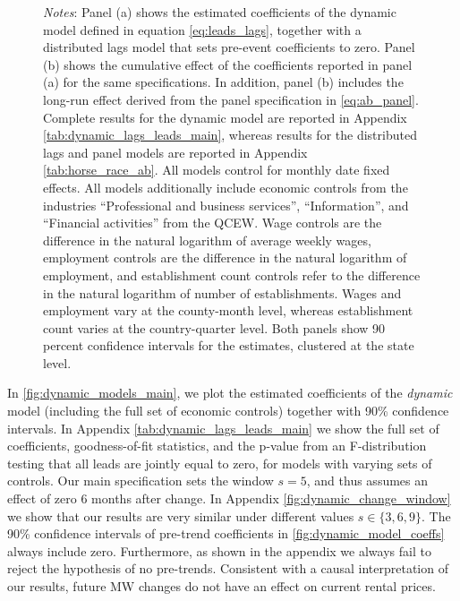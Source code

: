 \begin{figure}[htb!]
\begin{minipage}{0.95\textwidth}
		\vspace{2mm} 
		\textit{Notes}: Panel (a) shows the estimated coefficients of the dynamic model defined 
		in equation \autoref{eq:leads_lags}, together with a distributed lags model that sets 
		pre-event coefficients to zero. Panel (b) shows the cumulative effect of the coefficients 
		reported in panel (a) for the same specifications. In addition, panel (b) includes the 
		long-run effect derived from the panel specification in \autoref{eq:ab_panel}. Complete 
		results for the dynamic model are reported in Appendix 
		\autoref{tab:dynamic_lags_leads_main}, whereas results for the distributed lags and panel 
		models are reported in Appendix \autoref{tab:horse_race_ab}. All models control for 
		monthly date fixed effects. All models additionally  include economic controls from the 
		industries ``Professional and business services'', ``Information'', and ``Financial 
		activities'' from the QCEW. Wage controls are the difference in the natural logarithm of 
		average weekly wages, employment controls are the difference in the natural logarithm of 
		employment, and establishment count controls refer to the difference in the natural 
		logarithm of number of establishments. Wages and employment vary at the county-month 
		level, whereas establishment count varies at the country-quarter level. Both panels
		show 90 percent confidence intervals for the estimates, clustered at the state level. 
	\end{minipage}
\end{figure}


In \autoref{fig:dynamic_models_main}, we plot the estimated coefficients of the \textit{dynamic} 
model (including the full set of economic controls) together with 90\% confidence intervals. In
Appendix \autoref{tab:dynamic_lags_leads_main} we show the full set of coefficients, goodness-of-fit 
statistics, and the p-value from an F-distribution testing that all leads are jointly equal to zero, 
for models with varying sets of controls. Our main specification sets the window $s=5$, and thus
assumes an effect of zero 6 months after change. In Appendix \autoref{fig:dynamic_change_window} 
we show that our results are very similar under different values $s \in \{3, 6, 9\}$. The 90\% 
confidence intervals of pre-trend coefficients in \autoref{fig:dynamic_model_coeffs} always include 
zero. Furthermore, as shown in the appendix we always fail to reject the hypothesis of no pre-trends. 
Consistent with a causal interpretation of our results, future MW changes do not have an effect on 
current rental prices. 

